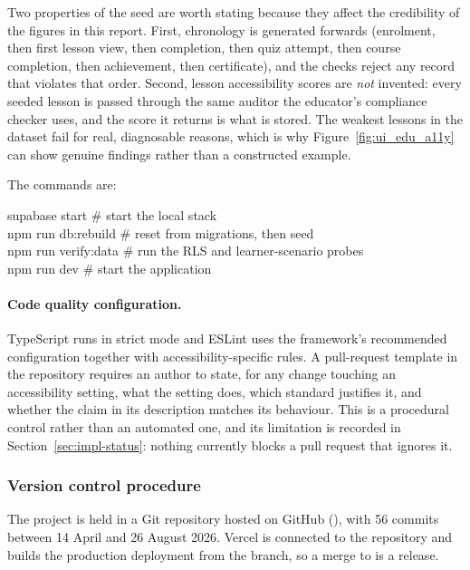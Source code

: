\documentclass[12pt, oneside]{article} %
\newcommand{\tcode}[1]{\path{#1}}
\begin{document}
Two properties of the seed are worth stating because they affect the credibility of the figures in this report. First, chronology is generated forwards (enrolment, then first lesson view, then completion, then quiz attempt, then course completion, then achievement, then certificate), and the checks reject any record that violates that order. Second, lesson accessibility scores are \emph{not} invented: every seeded lesson is passed through the same auditor the educator's compliance checker uses, and the score it returns is what is stored. The weakest lessons in the dataset fail for real, diagnosable reasons, which is why Figure~\ref{fig:ui_edu_a11y} can show genuine findings rather than a constructed example.

The commands are:

\begin{tcolorbox}[listing only, breakable, boxsep=2pt, left=2pt, right=2pt]
\footnotesize\ttfamily
supabase start \hfill \# start the local stack \\
npm run db:rebuild \hfill \# reset from migrations, then seed \\
npm run verify:data \hfill \# run the RLS and learner-scenario probes \\
npm run dev \hfill \# start the application
\end{tcolorbox}

\paragraph{Code quality configuration.} TypeScript runs in strict mode and ESLint uses the framework's recommended configuration together with accessibility-specific rules. A pull-request template in the repository requires an author to state, for any change touching an accessibility setting, what the setting does, which standard justifies it, and whether the claim in its description matches its behaviour. This is a procedural control rather than an automated one, and its limitation is recorded in Section~\ref{sec:impl-status}: nothing currently blocks a pull request that ignores it.

\subsubsection{Version control procedure}

The project is held in a Git repository hosted on GitHub (\tcode{aliff1024/ACESS}), with 56 commits between 14 April and 26 August 2026. Vercel is connected to the repository and builds the production deployment from the \tcode{main} branch, so a merge to \tcode{main} is a release.
\end{document}

